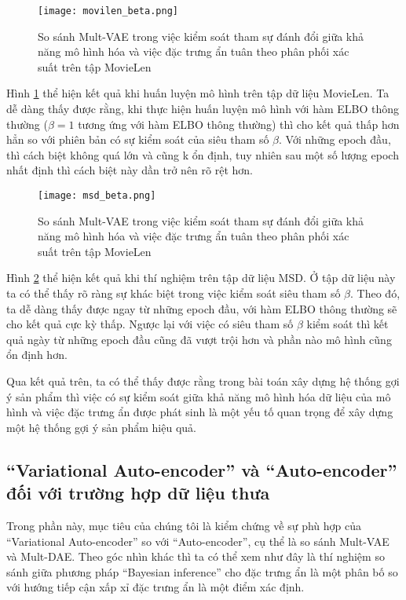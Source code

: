    \begin{figure}
    \centering
    \texttt{[image: movilen\_beta.png]}
    \caption[Mô hình Mult-VAE trong việc kiểm soát siêu tham số]{So sánh Mult-VAE trong việc kiểm soát tham sự đánh đổi giữa khả năng mô hình hóa và việc đặc trưng ẩn tuân theo phân phối xác suất trên tập MovieLen}
    \label{beta_movielen}
    \end{figure}

    Hình \ref{beta_movielen} thể hiện kết quả khi huấn luyện mô hình trên tập dữ liệu MovieLen.
    Ta dễ dàng thấy được rằng, khi thực hiện huấn luyện mô hình với hàm ELBO thông thường ($\beta=1$ tương ứng với hàm ELBO thông thường) thì cho kết quả thấp hơn hẳn so với phiên bản có sự kiểm soát của siêu tham số $\beta$.
    Với những epoch đầu, thì cách biệt không quá lớn và cũng k ổn định, tuy nhiên sau một số lượng epoch nhất định thì cách biệt này dần trở nên rõ rệt hơn.

    \begin{figure}
        \centering
        \texttt{[image: msd\_beta.png]}
        \caption[Mô hình Mult-VAE trong việc kiểm soát siêu tham số]{So sánh Mult-VAE trong việc kiểm soát tham sự đánh đổi giữa khả năng mô hình hóa và việc đặc trưng ẩn tuân theo phân phối xác suất trên tập MovieLen}
        \label{beta_msd}
    \end{figure}


    
    Hình \ref{beta_msd} thể hiện kết quả khi thí nghiệm trên tập dữ liệu MSD. 
    Ở tập dữ liệu này ta có thể thấy rõ ràng sự khác biệt trong việc kiểm soát siêu tham số $\beta$.
    Theo đó, ta dễ dàng thấy được ngay từ những epoch đầu, với hàm ELBO thông thường sẽ cho kết quả cực kỳ thấp. 
    Ngược lại với việc có siêu tham số $\beta$ kiểm soát thì kết quả ngày từ những epoch đầu cũng đã vượt trội hơn và phần nào mô hình cũng ổn định hơn. 

    Qua kết quả trên, ta có thể thấy được rằng trong bài toán xây dựng hệ thống gợi ý sản phẩm thì việc có sự kiểm soát giữa khả năng mô hình hóa dữ liệu của mô hình và việc đặc trưng ẩn được phát sinh là một yếu tố quan trọng để xây dựng một hệ thống gợi ý sản phẩm hiệu quả.



   
    \subsection{``Variational Auto-encoder'' và ``Auto-encoder'' đối với trường hợp dữ liệu thưa}
    Trong phần này, mục tiêu của  chúng tôi là kiểm chứng về sự phù hợp của ``Variational Auto-encoder'' so với ``Auto-encoder'', cụ thể là so sánh Mult-VAE và Mult-DAE.
    Theo góc nhìn khác thì ta có thể xem như đây là thí nghiệm so sánh giữa phương pháp ``Bayesian inference'' cho đặc trưng ẩn là một phân bố so với hướng tiếp cận xấp xỉ đặc trưng ẩn là một điểm xác định.

